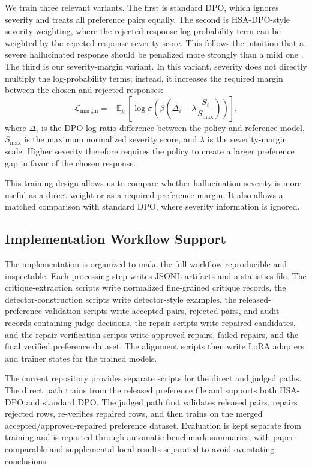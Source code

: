 \documentclass{article}
\begin{document}
We train three relevant variants. The first is standard DPO, which ignores severity and treats all preference pairs equally. The second is HSA-DPO-style severity weighting, where the rejected response log-probability term can be weighted by the rejected response severity score. This follows the intuition that a severe hallucinated response should be penalized more strongly than a mild one \citep{xiao2025hsa}. The third is our severity-margin variant. In this variant, severity does not directly multiply the log-probability terms; instead, it increases the required margin between the chosen and rejected responses:
\begin{equation}
\mathcal{L}_{\mathrm{margin}} =
-\mathbb{E}_{p_i}
\left[
\log \sigma\left(
\beta\left(\Delta_i - \lambda \frac{S_i}{S_{\max}}\right)
\right)
\right],
\end{equation}
where $\Delta_i$ is the DPO log-ratio difference between the policy and reference model, $S_{\max}$ is the maximum normalized severity score, and $\lambda$ is the severity-margin scale. Higher severity therefore requires the policy to create a larger preference gap in favor of the chosen response.

This training design allows us to compare whether hallucination severity is more useful as a direct weight or as a required preference margin. It also allows a matched comparison with standard DPO, where severity information is ignored.

\subsection{Implementation Workflow Support}

The implementation is organized to make the full workflow reproducible and inspectable. Each processing step writes JSONL artifacts and a statistics file. The critique-extraction scripts write normalized fine-grained critique records, the detector-construction scripts write detector-style examples, the released-preference validation scripts write accepted pairs, rejected pairs, and audit records containing judge decisions, the repair scripts write repaired candidates, and the repair-verification scripts write approved repairs, failed repairs, and the final verified preference dataset. The alignment scripts then write LoRA adapters and trainer states for the trained models.

The current repository provides separate scripts for the direct and judged paths. The direct path trains from the released preference file and supports both HSA-DPO and standard DPO. The judged path first validates released pairs, repairs rejected rows, re-verifies repaired rows, and then trains on the merged accepted/approved-repaired preference dataset. Evaluation is kept separate from training and is reported through automatic benchmark summaries, with paper-comparable and supplemental local results separated to avoid overstating conclusions.
\end{document}

